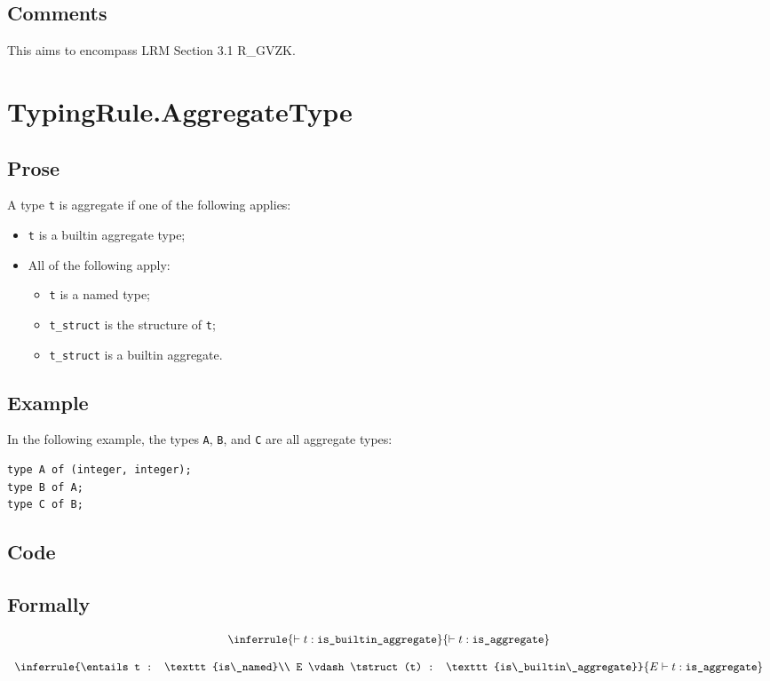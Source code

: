 \documentclass{book}
\newcommand\isbuiltinaggregate[0]{\texttt{is\_builtin\_aggregate}}
\newcommand\isnamed[0]{\texttt{is\_named}}
\newcommand\isaggregate[0]{\texttt{is\_aggregate}}
\begin{document}
    \subsection{Comments}
    This aims to encompass LRM Section 3.1 R\_GVZK.

\section{TypingRule.AggregateType}

    \subsection{Prose}
    A type \texttt{t} is aggregate if one of the following applies:
    \begin{itemize}
    \item \texttt{t} is a builtin aggregate type;
    \item All of the following apply:
      \begin{itemize}
      \item \texttt{t} is a named type;
      \item \texttt{t\_struct} is the structure of \texttt{t};
      \item \texttt{t\_struct} is a builtin aggregate. 
      \end{itemize}
    \end{itemize}

    \subsection{Example}
In the following example, the types \texttt{A}, \texttt{B}, and \texttt{C} are all aggregate types:
\begin{verbatim}
type A of (integer, integer);
type B of A;
type C of B;
\end{verbatim}

    \subsection{Code}

\begin{formal}
      \subsection{Formally}
      
\[
\begin{array}{c}
\inferrule{\entails t : \isbuiltinaggregate}{\entails t : \isaggregate}\\
\\
\inferrule{\entails t : \isnamed \\ E \vdash \tstruct(t) : \isbuiltinaggregate}{E \entails t : \isaggregate}
\end{array}
\]
\end{formal}
\end{document}
